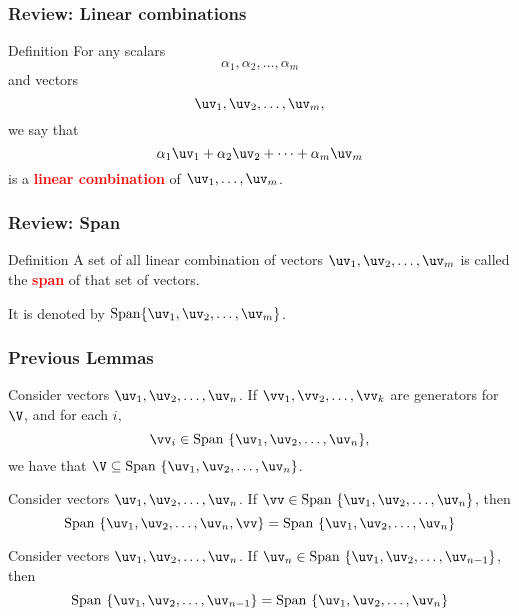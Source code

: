 

\begin{frame}
  \frametitle{Review: Linear combinations}

  \begin{block}{Definition}
    For any scalars
    \[
    \alpha_1,\alpha_2,\ldots,\alpha_m
    \]
    and vectors
    \[
    \uv_1,\uv_2,\ldots,\uv_m,
    \]
    we say that
    \[
    \alpha_1\uv_1 + \alpha_2\uv_2 + \cdots + \alpha_m \uv_m
    \]
    is a \textcolor{red}{\bf linear combination} of $\uv_1,\ldots,\uv_m$.
  \end{block}
\end{frame}

\begin{frame}
  \frametitle{Review: Span}

  \begin{block}{Definition}
    A set of all linear combination of vectors $\uv_1,\uv_2,\ldots,\uv_m$ is called the \textcolor{red}{\bf span} of that set of vectors.

    It is denoted by $\mathrm{Span} \{\uv_1,\uv_2,\ldots,\uv_m\}$.
  \end{block}
\end{frame}


\begin{frame}
  \frametitle{Previous Lemmas}
  \begin{lemma}
    Consider vectors $\uv_1,\uv_2,\ldots,\uv_n$.
    If $\vv_1,\vv_2,\ldots,\vv_k$ are generators for $\V$, and for each $i$,
    \[
    \vv_i\in \mathrm{Span}\ \{\uv_1,\uv_2,\ldots,\uv_n\},
    \]
    we have that $\V \subseteq \mathrm{Span}\ \{\uv_1,\uv_2,\ldots,\uv_n\}$.
  \end{lemma}
\end{frame}

\begin{frame}
  \begin{lemma}
    Consider vectors $\uv_1,\uv_2,\ldots,\uv_n$.
    If $\vv\in \mathrm{Span}\ \{\uv_1,\uv_2,\ldots,\uv_n\}$, then
    \[
    \mathrm{Span}\ \{\uv_1,\uv_2,\ldots,\uv_n,\vv\}
    =
    \mathrm{Span}\ \{\uv_1,\uv_2,\ldots,\uv_n\}
    \]
    \label{lemma:sup-vect}
  \end{lemma}
  \pause
  \begin{lemma}
    Consider vectors $\uv_1,\uv_2,\ldots,\uv_n$.
    If $\uv_n\in \mathrm{Span}\ \{\uv_1,\uv_2,\ldots,\uv_{n-1}\}$, then
    \[
    \mathrm{Span}\ \{\uv_1,\uv_2,\ldots,\uv_{n-1}\}
    =
    \mathrm{Span}\ \{\uv_1,\uv_2,\ldots,\uv_n\}
    \]
  \end{lemma}
\end{frame}

